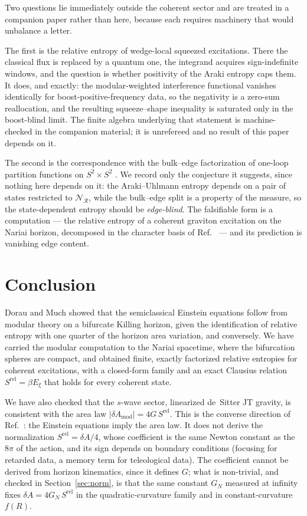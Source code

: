 \documentclass[11pt]{article}
\newcommand{\Srel}{S^{\mathrm{rel}}}
\newcommand{\Nariai}{Nariai}
\begin{document}
Two questions lie immediately outside the coherent sector and are treated in a companion paper \cite{SuppNariai} rather than here, because each requires machinery that would unbalance a letter.

The first is the relative entropy of wedge-local squeezed excitations. There the classical flux is replaced by a quantum one, the integrand acquires sign-indefinite windows, and the question is whether positivity of the Araki entropy caps them. It does, and exactly: the modular-weighted interference functional vanishes identically for boost-positive-frequency data, so the negativity is a zero-sum reallocation, and the resulting squeeze--shape inequality is saturated only in the boost-blind limit. The finite algebra underlying that statement is machine-checked in the companion material; it is unrefereed and no result of this paper depends on it.

The second is the correspondence with the bulk--edge factorization of one-loop partition functions on $S^2 \times S^2$ \cite{LawLochabPRL,LawLochabPRD}. We record only the conjecture it suggests, since nothing here depends on it: the Araki--Uhlmann entropy depends on a pair of states restricted to $\mathscr{N}_{\mathcal{R}}$, while the bulk--edge split is a property of the measure, so the state-dependent entropy should be \emph{edge-blind}. The falsifiable form is a computation --- the relative entropy of a coherent graviton excitation on the \Nariai{} horizon, decomposed in the character basis of Ref.~\cite{Mukherjee} --- and its prediction is vanishing edge content.

\section{Conclusion}
\label{sec:conclusion}

Dorau and Much showed that the semiclassical Einstein equations follow from modular theory on a bifurcate Killing horizon, given the identification of relative entropy with one quarter of the horizon area variation, and conversely. We have carried the modular computation to the Nariai spacetime, where the bifurcation spheres are compact, and obtained finite, exactly factorized relative entropies for coherent excitations, with a closed-form family and an exact Clausius relation $\Srel=\beta E_\xi$ that holds for every coherent state.

We have also checked that the $s$-wave sector, linearized de~Sitter JT gravity, is consistent with the area law $|\delta A_{\mathrm{mod}}|=4G\,\Srel$. This is the converse direction of Ref.~\cite{DorauMuch}: the Einstein equations imply the area law. It does not derive the normalization $\Srel=\delta A/4$, whose coefficient is the same Newton constant as the $8\pi$ of the action, and its sign depends on boundary conditions (focusing for retarded data, a memory term for teleological data). The coefficient cannot be derived from horizon kinematics, since it defines $G$; what is non-trivial, and checked in Section~\ref{sec:norm}, is that the same constant $G_N$ measured at infinity fixes $\delta A=4G_N\,\Srel$ in the quadratic-curvature family and in constant-curvature $f(R)$.
\end{document}

